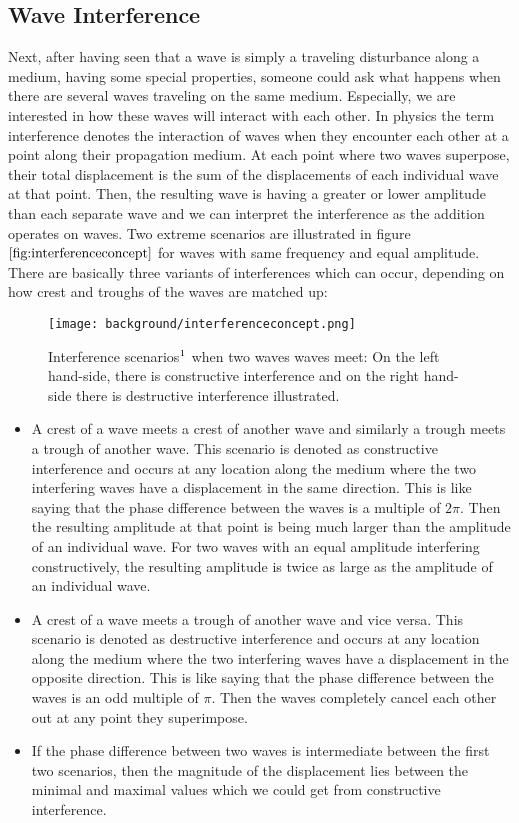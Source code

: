 \subsection{Wave Interference}
Next, after having seen that a wave is simply a traveling disturbance along a medium, having some special properties, someone could ask what happens when there are several waves traveling on the same medium. Especially, we are interested in how these waves will interact with each other. In physics the term interference denotes the interaction of waves when they encounter each other at a point along their propagation medium. At each point where two waves superpose, their total displacement is the sum of the displacements of each individual wave at that point. Then, the resulting wave is having a greater or lower amplitude than each separate wave and we can interpret the interference as the addition operates on waves. Two extreme scenarios are illustrated in figure $\ref{fig:interferenceconcept}$ for waves with same frequency and equal amplitude. There are basically three variants of interferences which can occur, depending on how crest and troughs of the waves are matched up:

\begin{figure}[H]
  \centering
  \texttt{[image: background/interferenceconcept.png]}
  \caption[interference]{Interference scenarios$\footnotemark$ when two waves waves meet: On the left hand-side, there is constructive interference and on the right hand-side there is destructive interference illustrated.}
  \label{fig:interferenceconcept}
\end{figure}

\begin{itemize}
  \item A crest of a wave meets a crest of another wave and similarly a trough meets a trough of another wave. This scenario is denoted as constructive interference and occurs at any location along the medium where the two interfering waves have a displacement in the same direction. This is like saying that the phase difference between the waves is a multiple of $2\pi$. Then the resulting amplitude at that point is being much larger than the amplitude of an individual wave. For two waves with an equal amplitude interfering constructively, the resulting amplitude is twice as large as the amplitude of an individual wave.
  \item A crest of a wave meets a trough of another wave and vice versa. This scenario is denoted as destructive interference and occurs at any location along the medium where the two interfering waves have a displacement in the opposite direction. This is like saying that the phase difference between the waves is an odd multiple of $\pi$. Then the waves completely cancel each other out at any point they superimpose.
  \item If the phase difference between two waves is intermediate between the first two scenarios, then the magnitude of the displacement lies between the minimal and maximal values which we could get from constructive interference.
\end{itemize}

